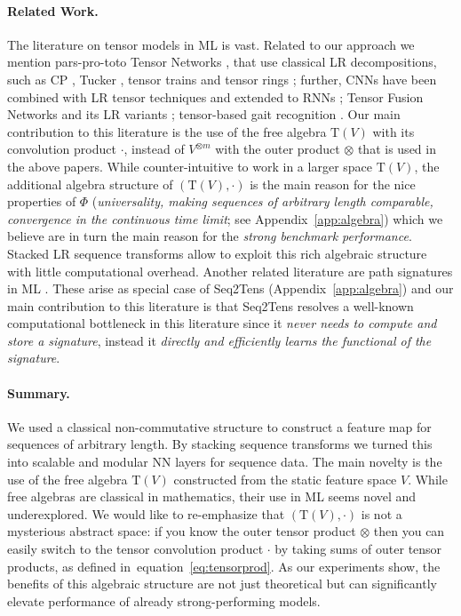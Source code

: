\documentclass{article} \usepackage{iclr2021_conference,times}
\def\eqref#1{equation~\ref{#1}}
\newcommand{\T}[1]{\mathrm{T}({#1})}
\theoremstyle{plain}
\theoremstyle{definition}
\begin{document}
\paragraph{Related Work.}
The literature on tensor models in ML is vast. 
Related to our approach we mention pars-pro-toto Tensor Networks \citep{cichocki2016tensor}, that use classical LR decompositions, such as CP \citep{carroll1970analysis}, Tucker \citep{tucker1966some}, tensor trains \citep{oseledets2011tensor} and tensor rings \citep{zhao2019learning};
further, CNNs have been combined with LR tensor techniques \citep{cohen2016expressive,kossaifi2017tensor} and extended to RNNs \citep{khrulkov2019generalized}; Tensor Fusion Networks \citep{zadeh2017tensor} and its LR variants \citep{liu2018efficient,liang2019learning,hou2019deep}; tensor-based gait recognition \citep{tao2007general}.
Our main contribution to this literature is the use of the free algebra $\T{V}$ with its convolution product $\cdot$, instead of $V^{\otimes m}$ with the outer product $\otimes$ that is used in the above papers. 
While counter-intuitive to work in a larger space $\T{V}$, the additional algebra structure of $(\T{V},\cdot)$ is the main reason for the nice properties of $\Phi$ (\emph{universality, making sequences of arbitrary length comparable, convergence in the continuous time limit}; see Appendix~\ref{app:algebra}) which we believe are in turn the main reason for the \emph{strong benchmark performance}. 
Stacked LR sequence transforms allow to exploit this rich algebraic structure with little computational overhead.
Another related literature are path signatures in ML \citep{lyons2014rough, primer2016, graham2013sparse, Deepsig, Toth19}.
These arise as special case of Seq2Tens (Appendix~\ref{app:algebra}) and our main contribution to this literature is that Seq2Tens resolves a well-known computational bottleneck in this literature since it \emph{never needs to compute and store a signature}, instead it \emph{directly and efficiently learns the functional of the signature}.   

\paragraph{Summary.}
We used a classical non-commutative structure to construct a feature map for sequences of arbitrary length. By stacking sequence transforms we turned this into scalable and modular NN layers for sequence data.
The main novelty is the use of the free algebra $\T{V}$ constructed from the static feature space $V$.  
While free algebras are classical in mathematics, their use in ML seems novel and underexplored.
We would like to re-emphasize that $(\T{V}, \cdot)$ is not a mysterious abstract space: if you know the outer tensor product $\otimes$ then you can easily switch to the tensor convolution product $\cdot$ by taking sums of outer tensor products, as defined in~\eqref{eq:tensorprod}.  
As our experiments show, the benefits of this algebraic structure are not just theoretical but can significantly elevate performance of already strong-performing models. 
\end{document}
